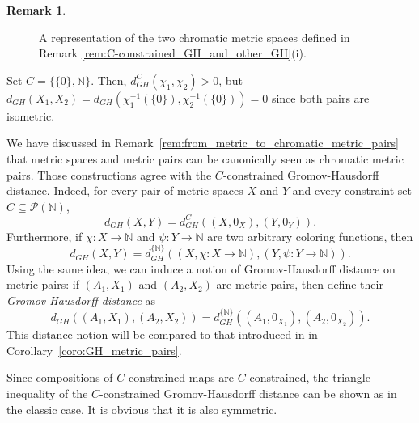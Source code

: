 \documentclass[8pt,a4paper,oneside,english,english]{article}
\theoremstyle{plain}
\theoremstyle
{plain}
\theoremstyle{definition}
\newtheorem{remark}[theorem]{Remark}%
\newcommand{\N}{\mathbb{N}}
\newcommand{\GH}{d_{GH}}
\begin{document}
\begin{remark}
\begin{compactenum}[(i)]
\begin{figure}[h!]
            \caption{\footnotesize A representation of the two chromatic metric spaces defined in Remark \ref{rem:C-constrained_GH_and_other_GH}(i).}\label{fig:GH_not_enough}
        \end{figure}
        
        Set $C=\{\{0\},\N\}$. Then, $\GH^{C}(\chi_1,\chi_2)>0$, but $\GH(X_1,X_2)=\GH(\chi_1^{-1}(\{0\}),\chi_2^{-1}(\{0\}))=0$ since both pairs are isometric.
		
        \item We have discussed in Remark~\ref{rem:from_metric_to_chromatic_metric_pairs} that metric spaces and metric pairs can be canonically seen as chromatic metric pairs. Those constructions agree with the $C$-constrained Gromov-Hausdorff distance. Indeed, for every pair of metric spaces $X$ and $Y$ and every
        constraint set $C\subseteq\mathcal P(\N)$,
	\[
		\GH(X,Y)=\GH^C((X,
        0_X)
        ,(Y,
        0_Y)
        ).
		\]
		Furthermore, if $\chi\colon X\to\N$ and $\psi\colon Y\to\N$ are two arbitrary coloring functions, then
		\[
		\GH(X,Y)=\GH^{\{\N\}}((X,\chi \colon X \to \N),(Y,\psi \colon Y \to \N)).
        \]
        Using the same idea, we can induce a notion of Gromov-Hausdorff distance on metric pairs: if $(A_1,X_1)$ and $(A_2,X_2)$ are metric pairs, then define their {\em Gromov-Hausdorff distance} as
        \[
        \GH((A_1,X_1),(A_2,X_2))=\GH^{\{\N\}}((A_1,0_{X_1}),(A_2,0_{X_2})).
        \]
        This distance notion will be compared to that introduced in \cite{GomChe} in Corollary~\ref{coro:GH_metric_pairs}.
		
        \item Since compositions of $C$-constrained maps are $C$-constrained, 
        the triangle inequality of the $C$-constrained Gromov-Hausdorff distance can be shown as in the classic case. It is obvious that it is also symmetric.
        

\end{compactenum}
\end{remark}
\end{document}
